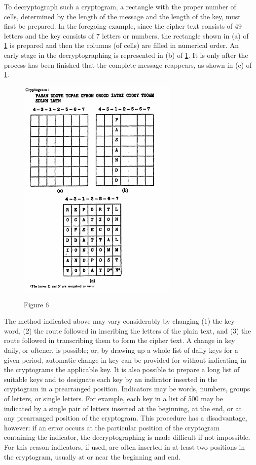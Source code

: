 \mypara To decryptograph such a cryptogram, a rectangle with the proper
number of cells, determined by the length of the message and the length
of the key, must first be prepared. In the foregoing example, since the
cipher text consists of 49 letters and the key consists of 7 letters or numbers, the rectangle shown in (a) of \ref{fig:Figure 6} is prepared and then the
columns (of cells) are filled in numerical order. An early stage in the
decryptographing is represented in (b) of \ref{fig:Figure 6}. It is only after the
process has been finished that the complete message reappears, as shown
in (c) of \ref{fig:Figure 6}.

\begin{figure}[h]
  \centering
    \includegraphics[width=0.7\textwidth,natwidth=466,natheight=649]{Chapter2_Figure6.png}
    \label{fig:Figure 6}
    \caption{Figure 6}
\end{figure}


\mypara The method indicated above may vary considerably by changing
(1) the key word, (2) the route followed in inscribing the letters of the
plain text, and (3) the route followed in transcribing them to form the
cipher text. A change in key daily, or oftener, is possible; or, by drawing
up a whole list of daily keys for a given period, automatic change in key
can be provided for without indicating in the cryptograms the applicable
key. It is also possible to prepare a long list of suitable keys and to
designate each key by an indicator inserted in the cryptogram in a prearranged position. Indicators may be words, numbers, groups of letters,
or single letters. For example, each key in a list of 500 may be indicated
by a single pair of letters inserted at the beginning, at the end, or at any
prearranged position of the cryptogram. This procedure has a disadvantage, however: if an error occurs at the particular position of the cryptogram containing the indicator, the decryptographing is made difficult if
not impossible. For this reason indicators, if used, are often inserted
in at least two positions in the cryptogram, usually at or near the
beginning and end.

